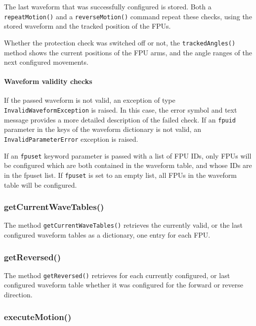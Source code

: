 \documentclass[11pt,a4paper]{scrartcl}
\begin{document}
The last waveform that was successfully configured is stored. Both a
\texttt{repeatMotion()} and a \texttt{reverseMotion()} command repeat
these checks, using the stored waveform and the tracked position of
the FPUs.


Whether the protection check was switched off or not, the
\texttt{trackedAngles()} method shows the current positions of the FPU
arms, and the angle ranges of the next configured movements.




\paragraph{Waveform validity checks}
\begin{sloppypar}
If the passed waveform is not valid, an exception of type
\texttt{InvalidWaveformException} is raised. In this case, the error
symbol and text message provides a more detailed description of the
failed check. If an \texttt{fpuid} parameter in the keys of the waveform dictionary
is not valid, an \texttt{InvalidParameterError} exception is raised.
\end{sloppypar}

If an \texttt{fpuset} keyword parameter is passed with a list of FPU
IDs, only FPUs will be configured which are both contained in the
waveform table, and whose IDs are in the fpuset list. If
\texttt{fpuset} is set to an empty list, all FPUs in the waveform
table will be configured.


\subsubsection{getCurrentWaveTables()}
 The method
\texttt{getCurrentWaveTables()} retrieves the currently valid, or the
last configured waveform tables as a dictionary, one entry for each
FPU.


\subsubsection{getReversed()}
 The method \texttt{getReversed()}
retrieves for each currently configured, or last configured waveform
table whether it was configured for the forward or reverse direction.



\subsubsection{executeMotion()}
\end{document}

